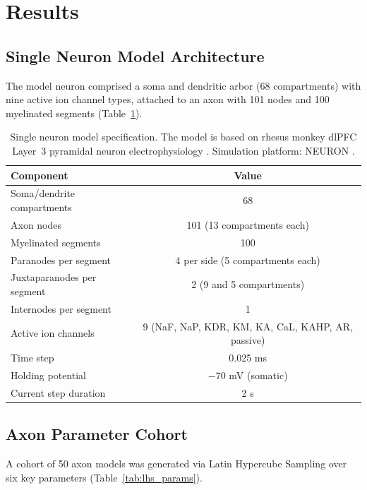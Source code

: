 \documentclass[11pt]{article}
\begin{document}
\section{Results}

\subsection{Single Neuron Model Architecture}

The model neuron comprised a soma and dendritic arbor (68 compartments) with nine active ion channel types, attached to an axon with 101 nodes and 100 myelinated segments (Table~\ref{tab:model_spec}).

\begin{table}[H]
\centering
\caption{Single neuron model specification. The model is based on rhesus monkey dlPFC Layer~3 pyramidal neuron electrophysiology \citep{rumbell2016dimensionality}. Simulation platform: NEURON \citep{hines1997neuron}.}
\label{tab:model_spec}
\begin{tabular}{lc}
\toprule
\textbf{Component} & \textbf{Value} \\
\midrule
Soma/dendrite compartments & 68 \\
Axon nodes & 101 (13 compartments each) \\
Myelinated segments & 100 \\
Paranodes per segment & 4 per side (5 compartments each) \\
Juxtaparanodes per segment & 2 (9 and 5 compartments) \\
Internodes per segment & 1 \\
Active ion channels & 9 (NaF, NaP, KDR, KM, KA, CaL, KAHP, AR, passive) \\
Time step & 0.025 ms \\
Holding potential & $-70$ mV (somatic) \\
Current step duration & 2 s \\
\bottomrule
\end{tabular}
\end{table}

\subsection{Axon Parameter Cohort}

A cohort of 50 axon models was generated via Latin Hypercube Sampling over six key parameters (Table~\ref{tab:lhs_params}).
\end{document}
